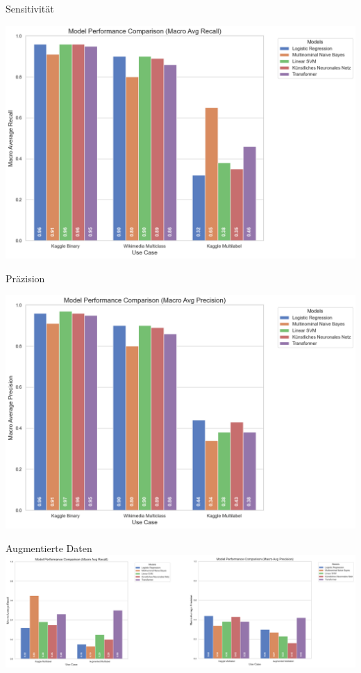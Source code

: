 \documentclass[aspectratio=169]{beamer} %
\begin{document}
\begin{frame}{Sensitivität}
\begin{center}
\includegraphics[scale=0.35]{figures/macro_avg_recall_usecases.png}
\end{center}
\end{frame}

\begin{frame}{Präzision}
\begin{center}
\includegraphics[scale=0.35]{figures/macro_avg_precision_usecases.png}
\end{center}
\end{frame}

\begin{frame}{Augmentierte Daten}
\includegraphics[scale=0.7]{figures/AugmentierteDatenVergleichZusammen.png}
\end{frame}
\end{document}
